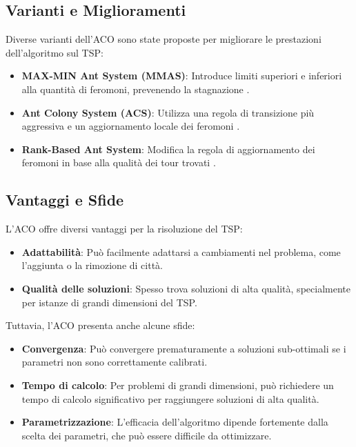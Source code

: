 \subsection{Varianti e Miglioramenti}

Diverse varianti dell'\Gls{ACO} sono state proposte per migliorare le prestazioni dell'algoritmo sul \Gls{TSP}:

\begin{itemize}
	\item \textbf{MAX-MIN Ant System (\Gls{MMAS})}: Introduce limiti superiori e inferiori alla quantità di feromoni, prevenendo la stagnazione \cite{stutzle2000max}.
	\item \textbf{Ant Colony System (\Gls{ACS})}: Utilizza una regola di transizione più aggressiva e un aggiornamento locale dei feromoni \cite{dorigo1997ant}.
	\item \textbf{Rank-Based Ant System}: Modifica la regola di aggiornamento dei feromoni in base alla qualità dei tour trovati \cite{bullnheimer1999rank}.
\end{itemize}

\subsection{Vantaggi e Sfide}

L'ACO offre diversi vantaggi per la risoluzione del \Gls{TSP}:

\begin{itemize}
	\item \textbf{Adattabilità}: Può facilmente adattarsi a cambiamenti nel problema, come l'aggiunta o la rimozione di città.
	\item \textbf{Qualità delle soluzioni}: Spesso trova soluzioni di alta qualità, specialmente per istanze di grandi dimensioni del \Gls{TSP}.
\end{itemize}

Tuttavia, l'\Gls{ACO} presenta anche alcune sfide:

\begin{itemize}
	\item \textbf{Convergenza}: Può convergere prematuramente a soluzioni sub-ottimali se i parametri non sono correttamente calibrati.
	\item \textbf{Tempo di calcolo}: Per problemi di grandi dimensioni, può richiedere un tempo di calcolo significativo per raggiungere soluzioni di alta qualità.
	\item \textbf{Parametrizzazione}: L'efficacia dell'algoritmo dipende fortemente dalla scelta dei parametri, che può essere difficile da ottimizzare.
\end{itemize}

